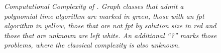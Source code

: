 \begin{center}
\begin{table}[ht]
{\begin{tabularx}{1.5\textwidth}{lllllll}
        
        \midrule
        \bottomrule
    \end{tabularx}
}
    \end{table}
\end{center}


\begin{figure}
    \centering
    \resizebox{1.0\textwidth}{!}{
        
    }
    \caption{\textit{Computational Complexity of \sdom. Graph classes that admit a polynomial time algorithm are marked in \textit{green}, those with an fpt algorithm in \textit{yellow}, those that are not fpt by solution size in \textit{red} and those that are unknown are left \textit{white}.
    An additional ``?''  marks those problems, where the classical complexity is also unknown.}}
    
    \label{fig:bigpicture}
\end{figure}

